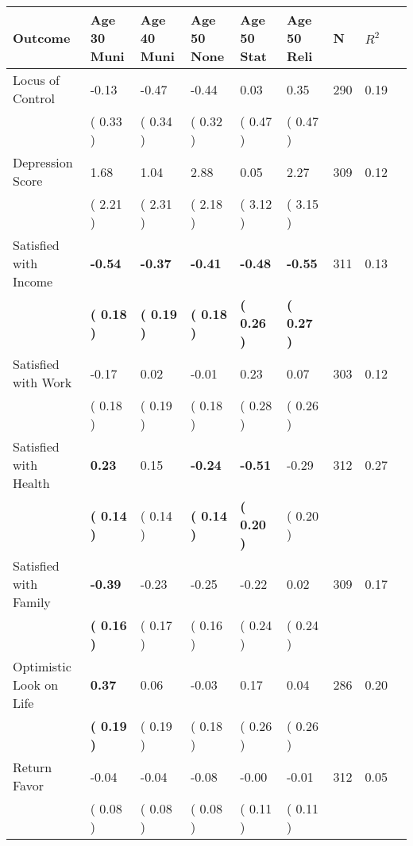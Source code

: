 \begin{tabular}{L{6.2cm} C{1.8cm} C{1.8cm} C{1.8cm} C{1.8cm} C{1.8cm} C{1.8cm} C{0.3cm} C{0.3cm}}
\toprule
 \textbf{Outcome} & \textbf{Age 30 Muni} & \textbf{Age 40 Muni} & \textbf{Age 50 None} & \textbf{Age 50 Stat} & \textbf{Age 50 Reli} & \textbf{N} & \textbf{$ R^2$} \\
\midrule
Locus of Control &     -0.13 &     -0.47 &     -0.44 &      0.03 &      0.35  & 290 &       0.19 \\ 
 & (     0.33 ) & (     0.34 ) & (     0.32 ) & (     0.47 ) & (     0.47 )  & \\
Depression Score &      1.68 &      1.04 &      2.88 &      0.05 &      2.27  & 309 &       0.12 \\ 
 & (     2.21 ) & (     2.31 ) & (     2.18 ) & (     3.12 ) & (     3.15 )  & \\
Satisfied with Income & \textbf{    -0.54} & \textbf{    -0.37} & \textbf{    -0.41} & \textbf{    -0.48} & \textbf{    -0.55}  & 311 &       0.13 \\ 
 & \textbf{(     0.18 )} & \textbf{(     0.19 )} & \textbf{(     0.18 )} & \textbf{(     0.26 )} & \textbf{(     0.27 )}  & \\
Satisfied with Work &     -0.17 &      0.02 &     -0.01 &      0.23 &      0.07  & 303 &       0.12 \\ 
 & (     0.18 ) & (     0.19 ) & (     0.18 ) & (     0.28 ) & (     0.26 )  & \\
Satisfied with Health & \textbf{     0.23} &      0.15 & \textbf{    -0.24} & \textbf{    -0.51} &     -0.29  & 312 &       0.27 \\ 
 & \textbf{(     0.14 )} & (     0.14 ) & \textbf{(     0.14 )} & \textbf{(     0.20 )} & (     0.20 )  & \\
Satisfied with Family & \textbf{    -0.39} &     -0.23 &     -0.25 &     -0.22 &      0.02  & 309 &       0.17 \\ 
 & \textbf{(     0.16 )} & (     0.17 ) & (     0.16 ) & (     0.24 ) & (     0.24 )  & \\
Optimistic Look on Life & \textbf{     0.37} &      0.06 &     -0.03 &      0.17 &      0.04  & 286 &       0.20 \\ 
 & \textbf{(     0.19 )} & (     0.19 ) & (     0.18 ) & (     0.26 ) & (     0.26 )  & \\
Return Favor &     -0.04 &     -0.04 &     -0.08 &     -0.00 &     -0.01  & 312 &       0.05 \\ 
 & (     0.08 ) & (     0.08 ) & (     0.08 ) & (     0.11 ) & (     0.11 )  & \\

\end{tabular}
